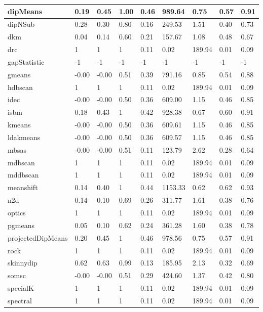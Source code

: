 \begin{table}[H]
\begin{tabular}{|l|l|l|l|l|l|l|l|l|}
\hline
dipMeans & 0.19 & 0.45 & 1.00 & 0.46 & 989.64 & 0.75 & 0.57 & 0.91 \\
\hline
dipNSub & 0.28 & 0.30 & 0.80 & 0.16 & 249.53 & 1.51 & 0.40 & 0.73 \\
\hline
dkm & 0.04 & 0.14 & 0.60 & 0.21 & 157.67 & 1.08 & 0.48 & 0.67 \\
\hline
drc & 1 & 1 & 1 & 0.11 & 0.02 & 189.94 & 0.01 & 0.09 \\
\hline
gapStatistic & -1 & -1 & -1 & -1 & -1 & -1 & -1 & -1 \\
\hline
gmeans & -0.00 & -0.00 & 0.51 & 0.39 & 791.16 & 0.85 & 0.54 & 0.88 \\
\hline
hdbscan & 1 & 1 & 1 & 0.11 & 0.02 & 189.94 & 0.01 & 0.09 \\
\hline
idec & -0.00 & -0.00 & 0.50 & 0.36 & 609.00 & 1.15 & 0.46 & 0.85 \\
\hline
isbm & 0.18 & 0.43 & 1 & 0.42 & 928.38 & 0.67 & 0.60 & 0.91 \\
\hline
kmeans & -0.00 & -0.00 & 0.50 & 0.36 & 609.61 & 1.15 & 0.46 & 0.85 \\
\hline
ldakmeans & -0.00 & -0.00 & 0.50 & 0.36 & 609.57 & 1.15 & 0.46 & 0.85 \\
\hline
mbsas & -0.00 & -0.00 & 0.51 & 0.11 & 123.79 & 2.62 & 0.28 & 0.64 \\
\hline
mdbscan & 1 & 1 & 1 & 0.11 & 0.02 & 189.94 & 0.01 & 0.09 \\
\hline
mddbscan & 1 & 1 & 1 & 0.11 & 0.02 & 189.94 & 0.01 & 0.09 \\
\hline
meanshift & 0.14 & 0.40 & 1 & 0.44 & 1153.33 & 0.62 & 0.62 & 0.93 \\
\hline
n2d & 0.14 & 0.10 & 0.69 & 0.26 & 311.77 & 1.61 & 0.38 & 0.76 \\
\hline
optics & 1 & 1 & 1 & 0.11 & 0.02 & 189.94 & 0.01 & 0.09 \\
\hline
pgmeans & 0.05 & 0.10 & 0.62 & 0.24 & 361.28 & 1.60 & 0.38 & 0.78 \\
\hline
projectedDipMeans & 0.20 & 0.45 & 1 & 0.46 & 978.56 & 0.75 & 0.57 & 0.91 \\
\hline
rock & 1 & 1 & 1 & 0.11 & 0.02 & 189.94 & 0.01 & 0.09 \\
\hline
skinnydip & 0.62 & 0.63 & 0.99 & 0.13 & 185.95 & 2.13 & 0.32 & 0.69 \\
\hline
somsc & -0.00 & -0.00 & 0.51 & 0.29 & 424.60 & 1.37 & 0.42 & 0.80 \\
\hline
specialK & 1 & 1 & 1 & 0.11 & 0.02 & 189.94 & 0.01 & 0.09 \\
\hline
spectral & 1 & 1 & 1 & 0.11 & 0.02 & 189.94 & 0.01 & 0.09 \\

\end{tabular}
\end{table}
